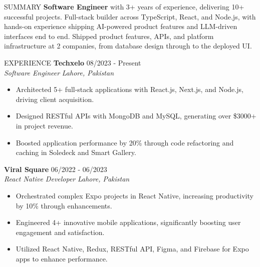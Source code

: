 \documentclass{resume}
\begin{document}
\begin{rSection}{SUMMARY}
\textbf{Software Engineer} with 3+ years of experience, delivering 10+ successful projects. Full-stack builder across TypeScript, React, and Node.js, with hands-on experience shipping AI-powered product features and LLM-driven interfaces end to end. Shipped product features, APIs, and platform infrastructure at 2 companies, from database design through to the deployed UI.
\end{rSection}
\begin{rSection}{EXPERIENCE}
\textbf{Techxelo} \hfill 08/2023 - Present \\
\textit{Software Engineer}  \hfill \textit{Lahore, Pakistan}
\begin{itemize}
\itemsep -3pt {}
\item Architected 5+ full-stack applications with React.js, Next.js, and Node.js, driving client acquisition.
\item Designed RESTful APIs with MongoDB and MySQL, generating over \$3000+ in project revenue.
\item Boosted application performance by 20\% through code refactoring and caching in Soledeck and Smart Gallery.
\end{itemize}
\textbf{Viral Square} \hfill 06/2022 - 06/2023 \\
\textit{React Native Developer} \hfill \textit{Lahore, Pakistan}
\begin{itemize}
\itemsep -3pt {}
\item Orchestrated complex Expo projects in React Native, increasing productivity by 10\% through enhancements.
\item Engineered 4+ innovative mobile applications, significantly boosting user engagement and satisfaction.
\item Utilized React Native, Redux, RESTful API, Figma, and Firebase for Expo apps to enhance performance.
\end{itemize}
\end{rSection}
\end{document}
